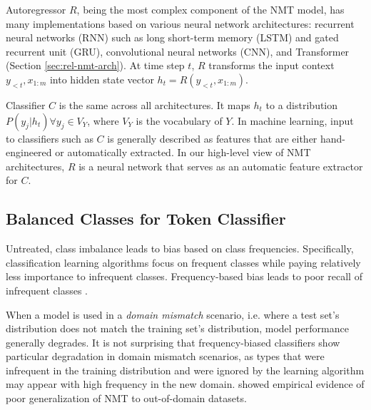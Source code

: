Autoregressor $R$, \cite{box2015time} being the most complex component of the NMT model,
has many implementations based on various neural network architectures: recurrent neural networks (RNN) such as long short-term memory (LSTM) and gated recurrent unit (GRU), convolutional neural networks (CNN), and Transformer (Section \ref{sec:rel-nmt-arch}).
At time step $t$, $R$ transforms the input context $y_{<t}, x_{1:m}$ into hidden state vector $h_t = R(y_{<t}, x_{1:m})$.

Classifier $C$ is the same across all architectures.
It maps $h_t$ to a distribution $P(y_j | h_t) \forall y_j \in V_Y$, where $V_Y$ is the vocabulary of $Y$.
In machine learning, input to classifiers such as $C$ is generally described as features that are either hand-engineered or automatically extracted. %
In our high-level view of NMT architectures, $R$ is a neural network that serves as an automatic feature extractor for $C$.


\subsection{Balanced Classes for Token Classifier}
\label{sec:classifier-balance}

Untreated, class imbalance leads to bias based on class frequencies.
Specifically, classification learning algorithms focus on frequent classes while paying relatively less importance to infrequent classes.
Frequency-based bias leads to poor recall of infrequent classes \cite{Johnson2019SurveyImbalance}.

When a model is used in a \textit{domain mismatch} scenario, i.e. where a test set's distribution does not match the training set's distribution, model performance generally degrades.
It is not surprising that frequency-biased classifiers show particular degradation in domain mismatch scenarios, as  types that were infrequent in the training distribution and were ignored by the learning algorithm may appear with high frequency in the new domain.
 showed empirical evidence of poor generalization of NMT to out-of-domain datasets.

